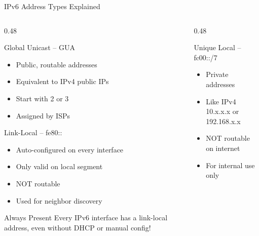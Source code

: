 \documentclass[aspectratio=169]{beamer}  %
\begin{document}
\begin{frame}[t,shrink=12]{IPv6 Address Types Explained}
    \begin{columns}[T]
        \begin{column}{0.48\textwidth}
            \begin{block}{Global Unicast -- GUA}
                \small
                \begin{itemize}
                    \item Public, routable addresses
                    \item Equivalent to IPv4 public IPs
                    \item Start with 2 or 3
                    \item Assigned by ISPs
                \end{itemize}
            \end{block}
            
            \vspace{0.2em}
            \begin{block}{Link-Local -- fe80::}
                \small
                \begin{itemize}
                    \item Auto-configured on every interface
                    \item Only valid on local segment
                    \item NOT routable
                    \item Used for neighbor discovery
                \end{itemize}
            \end{block}
            
            \vspace{0.2em}
            \begin{alertblock}{Always Present}
                \small
                Every IPv6 interface has a link-local address, even without DHCP or manual config!
            \end{alertblock}
        \end{column}
        \begin{column}{0.48\textwidth}
            \begin{block}{Unique Local -- fc00::/7}
                \small
                \begin{itemize}
                    \item Private addresses
                    \item Like IPv4 10.x.x.x or 192.168.x.x
                    \item NOT routable on internet
                    \item For internal use only
                \end{itemize}
            \end{block}
            

\end{column}
\end{columns}
\end{frame}
\end{document}
